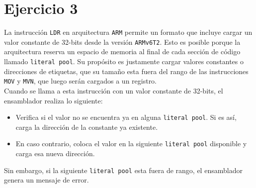 \documentclass[12pt]{article}
\begin{document}
	\section*{Ejercicio 3}
	La instrucción \verb|LDR| en arquitectura \verb|ARM| permite un formato que incluye cargar un valor constante de 32-bits desde la versión \verb|ARMv6T2|. Esto es posible porque la arquitectura reserva un espacio de memoria al final de cada sección de código llamado \verb|literal pool|. Su propósito es justamente cargar valores constantes o direcciones de etiquetas, que su tamaño esta fuera del rango de las instrucciones \verb|MOV| y \verb|MVN|, que luego serán cargados a un registro.\\
	Cuando se llama a esta instrucción con un valor constante de 32-bits, el ensamblador realiza lo siguiente:
	\begin{itemize}
		\item Verifica si el valor no se encuentra ya en alguna \verb|literal pool|. Si es así, carga la dirección de la constante ya existente. 
		\item En caso contrario, coloca el valor en la siguiente \verb|literal pool| disponible y carga esa nueva dirección.
	\end{itemize}
	Sin embargo, si la siguiente \verb|literal pool| esta fuera de rango, el ensamblador genera un mensaje de error. 
\end{document}
